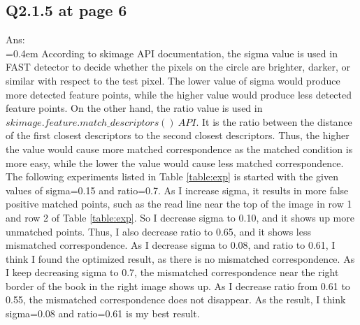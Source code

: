 \documentclass{article}
\begin{document}
	\newpage
	\subsection*{Q2.1.5 at page 6}
	Ans:\\
	\hangindent=0.4em \hspace{0.3em} According to skimage API documentation, the sigma value is used in FAST detector to decide whether the pixels on the circle are brighter, darker, or similar with respect to the test pixel. The lower value of sigma would produce more detected feature points, while the higher value would produce less detected feature points. On the other hand, the ratio value is used in $skimage.feature.match\_descriptors()\ API$. It is the ratio between the distance of the first closest descriptors to the second closest descriptors. Thus, the higher the value would cause more matched correspondence as the matched condition is more easy, while the lower the value would cause less matched correspondence. The following experiments listed in Table \ref{table:exp} is started with the given values of sigma=0.15 and ratio=0.7. As I increase sigma, it results in more false positive matched points, such as the read line near the top of the image in row 1 and row 2 of Table \ref{table:exp}. So I decrease sigma to 0.10, and it shows up more unmatched points. Thus, I also decrease ratio to 0.65, and it shows less mismatched correspondence. As I decrease sigma to 0.08, and ratio to 0.61, I think I found the optimized result, as there is no mismatched correspondence. As I keep decreasing sigma to 0.7, the mismatched correspondence near the right border of the book in the right image shows up. As I decrease ratio from 0.61 to 0.55, the mismatched correspondence does not disappear. As the result, I think sigma=0.08 and ratio=0.61 is my best result.
	 
\end{document}
